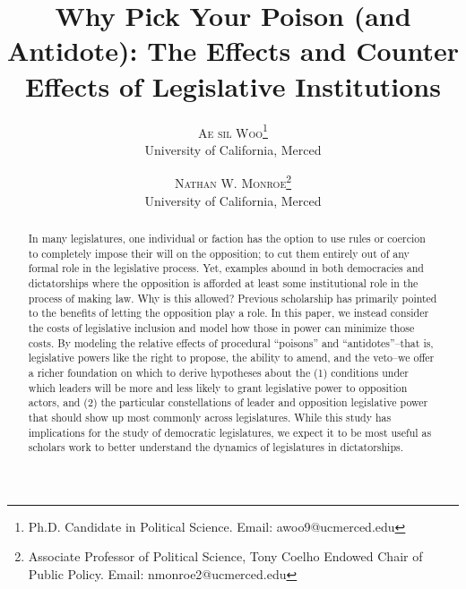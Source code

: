 \documentclass[12pt]{article}
\theoremstyle{plain}		      \newtheorem{assn}{Assumption}
\theoremstyle{plain}		      \newtheorem{prop}{Proposition}
\theoremstyle{plain}		      \newtheorem{lemma}{Lemma}
\theoremstyle{plain}	          \newtheorem{imp}{Implication}
\theoremstyle{plain}	          \newtheorem{hyp}{Hypothesis}
\theoremstyle{definition}		  \newtheorem{defn}{Definition}
\theoremstyle{remark}	          \newtheorem{rem}{Remark}
\theoremstyle{definition}         \newtheorem{case}{Case}
\begin{document}
\title{Why Pick Your Poison (and Antidote): The Effects and Counter Effects of Legislative Institutions%
}
\author{\Large \textsc{Ae sil Woo}\thanks{Ph.D. Candidate in Political Science. Email: awoo9@ucmerced.edu} \\
\normalsize University of California, Merced\\
\and
\Large \textsc{Nathan W. Monroe}\thanks{Associate Professor of Political Science, Tony Coelho Endowed Chair of Public Policy. Email: nmonroe2@ucmerced.edu} \\
\normalsize University of California, Merced} 
\date{ }


\maketitle
\thispagestyle{empty}


\begin{abstract}
\noindent \normalsize In many legislatures, one individual or faction has the option to use rules or coercion to completely impose their will on the opposition; to cut them entirely out of any formal role in the legislative process. Yet, examples abound in both democracies and dictatorships where the opposition is afforded at least some institutional role in the process of making law. Why is this allowed? Previous scholarship has primarily pointed to the benefits of letting the opposition play a role. In this paper, we instead consider the costs of legislative inclusion and model how those in power can minimize those costs. By modeling the relative effects of procedural ``poisons'' and ``antidotes''--that is, legislative powers like the right to propose, the ability to amend, and the veto--we offer a richer foundation on which to derive hypotheses about the (1) conditions under which leaders will be more and less likely to grant legislative power to opposition actors, and (2) the particular constellations of leader and opposition legislative power that should show up most commonly across legislatures. While this study has implications for the study of democratic legislatures, we expect it to be most useful as scholars work to better understand the dynamics of legislatures in dictatorships.
\end{abstract}
\newpage
\clearpage
{}
\doublespacing
\end{document}
